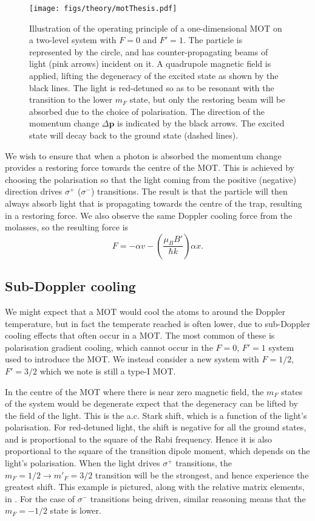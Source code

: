 \begin{figure}[ht]
  \centering
  \texttt{[image: figs/theory/motThesis.pdf]}
  \caption[MOT operating principle]{
    Illustration of the operating principle of a one-dimensional MOT on
    a two-level system with $F=0$ and $F'=1$. The particle is represented by
    the circle, and has counter-propagating beams of light (pink arrows)
    incident on it. A quadrupole magnetic field is applied, lifting the
    degeneracy of the excited state as shown by the black lines. The light is
    red-detuned so as to be resonant with the transition to the lower $m_F$
    state, but only the restoring beam will be absorbed due to the choice of
    polarisation. The direction of the momentum change $\Delta\mathbf{p}$ is
    indicated by the black arrows. The excited state will decay back to the
    ground state (dashed lines).
  }
  \label{theory:fig:MOT}
\end{figure}

We wish to ensure that when a photon is absorbed the momentum change provides a
restoring force towards the centre of the MOT. This is achieved by choosing the
polarisation  so that the light coming from the positive (negative) direction
drives $\sigma^+$ ($\sigma^-$) transitions. The result is
that the particle will then always absorb light that is propagating towards the
centre of the trap, resulting in a restoring force. We also observe the same
Doppler cooling force from the molasses, so the resulting force is
%
\begin{equation}
  F = - \alpha v - \left(\frac{\mu_B B'}{\hbar k}\right)\alpha x.
\end{equation}

\subsection{Sub-Doppler cooling}

We might expect that a MOT would cool the atoms to around the Doppler
temperature, but in fact the temperate reached is often lower, due to
sub-Doppler cooling effects that often occur in a MOT. The most common of these
is polarisation gradient cooling, which cannot occur in the $F=0$, $F'=1$
system used to introduce the MOT. We instead consider a new system with
$F=1/2$, $F'=3/2$ which we note is still a type-I MOT.

In the centre of the MOT where there is near zero magnetic field, the $m_F$
states of the system would be degenerate expect that the degeneracy can be
lifted by the field of the light. This is the a.c. Stark shift, which is a
function of the light's polarisation.
%
For red-detuned light, the shift is negative for all the ground states, and is
proportional to the square of the Rabi frequency. Hence it is also proportional
to the square of the transition dipole moment, which depends on the light's
polarisation.
%
When the light drives $\sigma^+$ transitions, the $m_F=1/2 \rightarrow
m'_F=3/2$ transition will be the strongest, and hence experience the greatest
shift. This example is pictured, along with the relative matrix elements, in 
. For the case of $\sigma^-$ transitions
being driven, similar reasoning means that the $m_F=-1/2$ state is lower.

